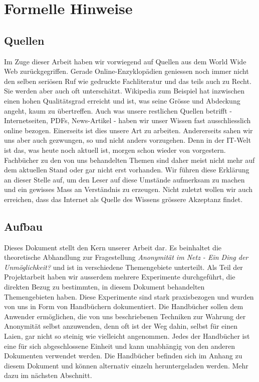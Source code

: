 \section{Formelle Hinweise}

\subsection{Quellen}
Im Zuge dieser Arbeit haben wir vorwiegend auf Quellen aus dem World Wide Web zurückgegriffen. Gerade Online-Enzyklopädien geniessen noch immer nicht den selben seriösen Ruf wie gedruckte Fachliteratur und das teils auch zu Recht. Sie werden aber auch oft unterschätzt. Wikipedia zum Beispiel hat inzwischen einen hohen Qualitätsgrad erreicht und ist, was seine Grösse und Abdeckung angeht, kaum zu übertreffen. Auch was unsere restlichen Quellen betrifft - Internetseiten, PDFs, News-Artikel - haben wir unser Wissen fast ausschliesslich online bezogen. Einerseits ist dies unsere Art zu arbeiten. Andererseits sahen wir uns aber auch gezwungen, so und nicht anders vorzugehen. Denn in der IT-Welt ist das, was heute noch aktuell ist, morgen schon wieder von vorgestern. Fachbücher zu den von uns behandelten Themen sind daher meist nicht mehr auf dem aktuellen Stand oder gar nicht erst vorhanden. Wir führen diese Erklärung an dieser Stelle auf, um den Leser auf diese Umstände aufmerksam zu machen und ein gewisses Mass an Verständnis zu erzeugen. Nicht zuletzt wollen wir auch erreichen, dass das Internet als Quelle des Wissens grössere Akzeptanz findet.

\subsection{Aufbau}
Dieses Dokument stellt den Kern unserer Arbeit dar. Es beinhaltet die theoretische Abhandlung zur Fragestellung \textit{Anonymität im Netz - Ein Ding der Unmöglichkeit?} und ist in verschiedene Themengebiete unterteilt. Als Teil der Projektarbeit haben wir ausserdem mehrere Experimente durchgeführt, die direkten Bezug zu bestimmten, in diesem Dokument behandelten Themengebieten haben. Diese Experimente sind stark praxisbezogen und  wurden von uns in Form von Handbüchern dokumentiert. Die Handbücher sollen dem Anwender ermöglichen, die von uns beschriebenen Techniken zur Wahrung der Anonymität selbst anzuwenden, denn oft ist der Weg dahin, selbst für einen Laien, gar nicht so steinig wie vielleicht angenommen. Jedes der Handbücher ist eine für sich abgeschlossene Einheit und kann unabhängig von den anderen Dokumenten verwendet werden. Die Handbücher befinden sich im Anhang zu diesem Dokument und können alternativ einzeln heruntergeladen werden. Mehr dazu im nächsten Abschnitt.

